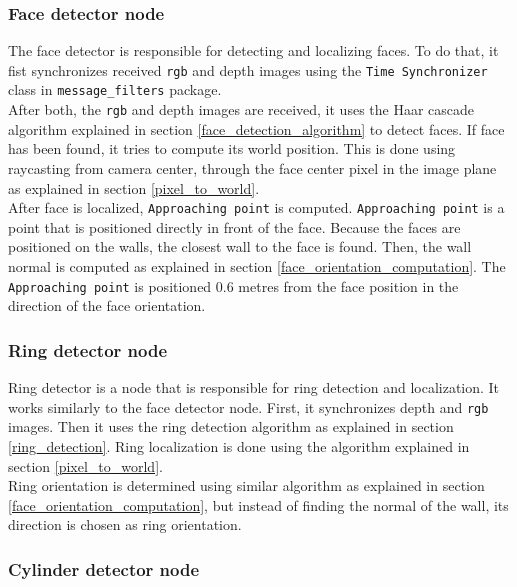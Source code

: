 \documentclass[12pt,a4paper]{article}
\begin{document}
	\subsubsection{Face detector node}
	The face detector is responsible for detecting and localizing faces. To do that, it fist synchronizes received \texttt{rgb} and depth images using the \texttt{Time Synchronizer} class in \texttt{message\_filters} package. \\

	After both, the \texttt{rgb} and depth images are received, it uses the Haar cascade algorithm explained in section \ref{face_detection_algorithm} to detect faces. If face has been found, it tries to compute its world position. This is done using raycasting from camera center, through the face center pixel in the image plane as explained in section \ref{pixel_to_world}. \\

	After face is localized, \texttt{Approaching point} is computed. \texttt{Approaching point} is a point that is positioned directly in front of the face. Because the faces are positioned on the walls, the closest wall to the face is found. Then, the wall normal is computed as explained in section \ref{face_orientation_computation}. The \texttt{Approaching point} is positioned 0.6 metres from the face position in the direction of the face orientation. \\

	\subsubsection{Ring detector node}
	Ring detector is a node that is responsible for ring detection and localization. It works similarly to the face detector node. First, it synchronizes depth and \texttt{rgb} images. Then it uses the ring detection algorithm as explained in section \ref{ring_detection}. Ring localization is done using the algorithm explained in section \ref{pixel_to_world}. \\
	
	Ring orientation is determined using similar algorithm as explained in section \ref{face_orientation_computation}, but instead of finding the normal of the wall, its direction is chosen as ring orientation. \\ %
	
	\subsubsection{Cylinder detector node}
\end{document}
